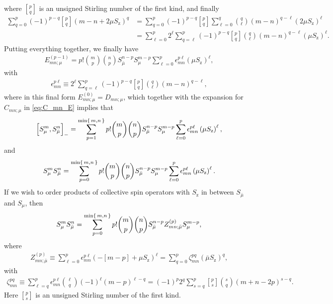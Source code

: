 \documentclass[aps,pra,twocolumn,longbibliography]{revtex4-2}
\newcommand{\p}[1]{\left( #1 \right)} %
\renewcommand{\sp}[1]{\left[ #1 \right]} %
\newcommand{\z}{\text{z}}
\newcommand{\bmu}{{\bar\mu}}
\newcommand{\1}{\mathds{1}}
\begin{document}
where ${ p \brack q }$ is an unsigned Stirling number of the first
kind, and finally
\begin{align}
  \sum_{q=0}^p \p{-1}^{p-q} { p \brack q } \p{m-n+2\mu S_\z}^q
  &= \sum_{q=0}^p \p{-1}^{p-q} { p \brack q } \sum_{\ell=0}^q
  { q \choose \ell } \p{m-n}^{q-\ell} \p{2\mu S_\z}^\ell \\
  &= \sum_{\ell=0}^p 2^\ell \sum_{q=\ell}^p \p{-1}^{p-q}
  { p \brack q } { q \choose \ell } \p{m-n}^{q-\ell} \p{\mu S_\z}^\ell.
\end{align}
Putting everything together, we finally have
\begin{align}
  E_{mn;\mu}^{(p-1)}
  = p! { m \choose p } { n \choose p }
  S_\bmu^{n-p} S_\mu^{m-p}
  \sum_{\ell=0}^p \epsilon_{mn}^{p\ell} \p{\mu S_\z}^\ell,
\end{align}
with
\begin{align}
  \epsilon_{mn}^{p\ell}
  \equiv 2^\ell \sum_{q=\ell}^p \p{-1}^{p-q}
  { p \brack q } { q \choose \ell } \p{m-n}^{q-\ell},
\end{align}
where in this final form $E_{mn;\mu}^{(0)} = D_{mn;\mu}$, which
together with the expansion for $C_{mn;\mu}$ in \eqref{eq:C_mn_E}
implies that
\begin{align}
  \sp{S_\mu^m, S_\bmu^n}_-
  = \sum_{p=1}^{\min\set{m,n}}
  p! { m \choose p } { n \choose p } S_\bmu^{n-p} S_\mu^{m-p}
  \sum_{\ell=0}^p \epsilon_{mn}^{p\ell} \p{\mu S_\z}^\ell,
  \label{eq:comm_mu}
\end{align}
and
\begin{align}
  S_\mu^m S_\bmu^n
  = \sum_{p=0}^{\min\set{m,n}}
  p! { m \choose p } { n \choose p } S_\bmu^{n-p} S_\mu^{m-p}
  \sum_{\ell=0}^p \epsilon_{mn}^{p\ell} \p{\mu S_\z}^\ell.
  \label{eq:push_mu_bmu}
\end{align}
If we wish to order products of collective spin operators with $S_\z$
in between $S_\bmu$ and $S_\mu$, then
\begin{align}
  S_\mu^m S_\bmu^n
  = \sum_{p=0}^{\min\set{m,n}} p! { m \choose p } { n \choose p }
  S_\bmu^{n-p} Z_{mn;\bmu}^{(p)} S_\mu^{m-p},
\end{align}
where
\begin{align}
  Z_{mn;\bmu}^{(p)}
  \equiv \sum_{\ell=0}^p \epsilon_{mn}^{p\ell}
  \p{-\sp{m-p} + \mu S_\z}^\ell
  = \sum_{q=0}^p \zeta_{mn}^{pq} \p{\bmu S_\z}^q,
  \label{eq:Z_mnp}
\end{align}
with
\begin{align}
  \zeta_{mn}^{pq}
  \equiv \sum_{\ell=q}^p \epsilon_{mn}^{p\ell}
  { \ell \choose q } \p{-1}^\ell \p{m-p}^{\ell-q}
  = \p{-1}^p 2^q \sum_{s=q}^p
  { p \brack s } { s \choose q } \p{m+n-2p}^{s-q}.
  \label{eq:zeta_mnpq}
\end{align}
Here ${ p \brack s }$ is an unsigned Stirling number of the first
kind.
\end{document}
